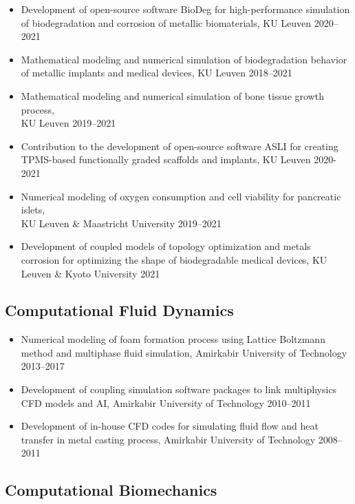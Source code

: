 \documentclass{cv}
\begin{document}
\begin{itemize}
\item
Development of open-source software BioDeg for high-performance simulation of biodegradation and corrosion of metallic biomaterials, {KU Leuven} \hfill 2020--2021
\item
Mathematical modeling and numerical simulation of biodegradation behavior of metallic implants and medical devices, {KU Leuven} \hfill 2018--2021
\item
Mathematical modeling and numerical simulation of bone tissue growth process, \\{KU Leuven} \hfill 2019--2021
\item 
Contribution to the development of open-source software ASLI for creating TPMS-based functionally graded scaffolds and implants, KU Leuven \hfill 2020-2021
\item
Numerical modeling of oxygen consumption and cell viability for pancreatic islets, \\{KU Leuven \& Maastricht University} \hfill 2019--2021
\item
Development of coupled models of topology optimization and metals corrosion for optimizing the shape of biodegradable medical devices, {KU Leuven \& Kyoto University} \hfill 2021
\end{itemize}

\subsection{Computational Fluid Dynamics}

\begin{itemize}
\item
Numerical modeling of foam formation process using Lattice Boltzmann method and multiphase fluid simulation, {Amirkabir University of Technology} \hfill 2013--2017
\item
Development of coupling simulation software packages to link multiphysics CFD models and AI, {Amirkabir University of Technology} \hfill 2010--2011
\item
Development of in-house CFD codes for simulating fluid flow and heat transfer in metal casting process, {Amirkabir University of Technology} \hfill 2008--2011
\end{itemize}

\subsection{Computational Biomechanics}
\end{document}
